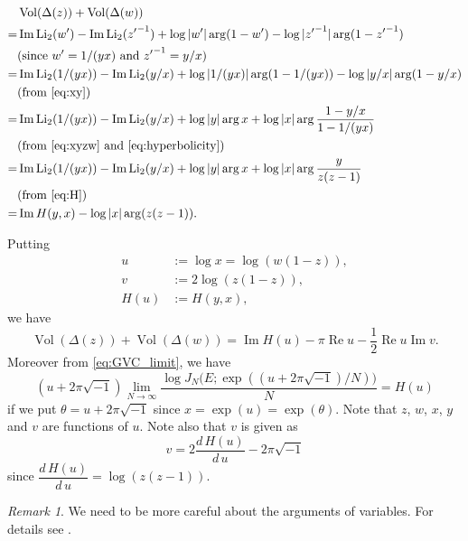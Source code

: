 \documentclass{amsart}
\newcommand{\Vol}{\operatorname{Vol}}
\newcommand{\Li}{\operatorname{Li}}
\renewcommand{\Re}{\operatorname{Re}}
\renewcommand{\Im}{\operatorname{Im}}
\theoremstyle{definition}
\theoremstyle{remark}
\newtheorem{remark}[theorem]{Remark}
\numberwithin{equation}{section}
\begin{document}
\begin{equation}\label{eq:Vol_H1}
\begin{split}
  &\Vol(\Delta(z))+\Vol(\Delta(w))
  \\
  =&
  \Im\Li_2(w')-\Im\Li_2({z'}^{-1})
  +\log|w'|\arg(1-w')-\log|{z'}^{-1}|\arg(1-{z'}^{-1})
  \\
  &\text{(since $w'=1/(yx)$ and ${z'}^{-1}=y/x$)}
  \\
  =&
  \Im\Li_2(1/(yx))-\Im\Li_2(y/x)
  +\log|1/(yx)|\arg(1-1/(yx))-\log|y/x|\arg(1-y/x)
  \\
  &\text{(from \eqref{eq:xy})}
  \\
  =&
  \Im\Li_2(1/(yx))-\Im\Li_2(y/x)
  +\log|y|\arg{x}+\log|x|\arg\frac{1-y/x}{1-1/(yx)}
  \\
  &\text{(from \eqref{eq:xyzw} and \eqref{eq:hyperbolicity})}
  \\
  =&
  \Im\Li_2(1/(yx))-\Im\Li_2(y/x)
  +\log|y|\arg{x}+\log|x|\arg\frac{y}{z(z-1)}
  \\
  &\text{(from \eqref{eq:H})}
  \\
  =&
  \Im H(y,x)-\log|x|\arg(z(z-1)).
\end{split}
\end{equation}
\par
Putting
\begin{align*}
  u&:=\log{x}=\log(w(1-z)),
  \\
  v&:=2\log(z(1-z)),
  \\
  H(u)&:=H(y,x),
\end{align*}
we have
\begin{equation}\label{eq:Vol_H2}
  \Vol(\Delta(z))+\Vol(\Delta(w))
  =
  \Im H(u)-\pi\Re{u}-\frac{1}{2}\Re{u}\Im{v}.
\end{equation}
Moreover from \eqref{eq:GVC_limit}, we have
\begin{equation*}
  (u+2\pi\sqrt{-1})
  \lim_{N\to\infty}
  \frac{\log{J_N\bigl(E;\exp((u+2\pi\sqrt{-1})/N)\bigr)}}{N}
  =
  H(u)
\end{equation*}
if we put $\theta=u+2\pi\sqrt{-1}$ since $x=\exp(u)=\exp(\theta)$.
Note that $z$, $w$, $x$, $y$ and $v$ are functions of $u$.
Note also that $v$ is given as
\begin{equation*}
  v
  =
  2\frac{d\,H(u)}{d\,u}-2\pi\sqrt{-1}
\end{equation*}
since $\dfrac{d\,H(u)}{d\,u}=\log(z(z-1))$.
\begin{remark}
We need to be more careful about the arguments of variables.
For details see \cite{Murakami/Yokota:JREIA2007}.
\end{remark}
\end{document}
